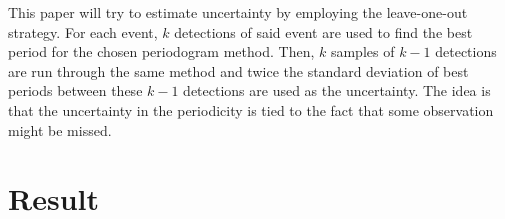 \documentclass[
  rmp,
  amsmath,
  amssymb,
  preprint]{revtex4-2}
\begin{document}
This paper will try to estimate uncertainty by employing the
leave-one-out strategy. For each event, \(k\) detections of said event
are used to find the best period for the chosen periodogram method.
Then, \(k\) samples of \(k-1\) detections are run through the same
method and twice the standard deviation of best periods between these
\(k-1\) detections are used as the uncertainty. The idea is that the
uncertainty in the periodicity is tied to the fact that some observation
might be missed.

\hypertarget{result}{%
\section{Result}\label{result}}

\begin{figure}

\begin{minipage}[t]{\linewidth}

{\centering 

}
\end{minipage}
\end{figure}
\end{document}
